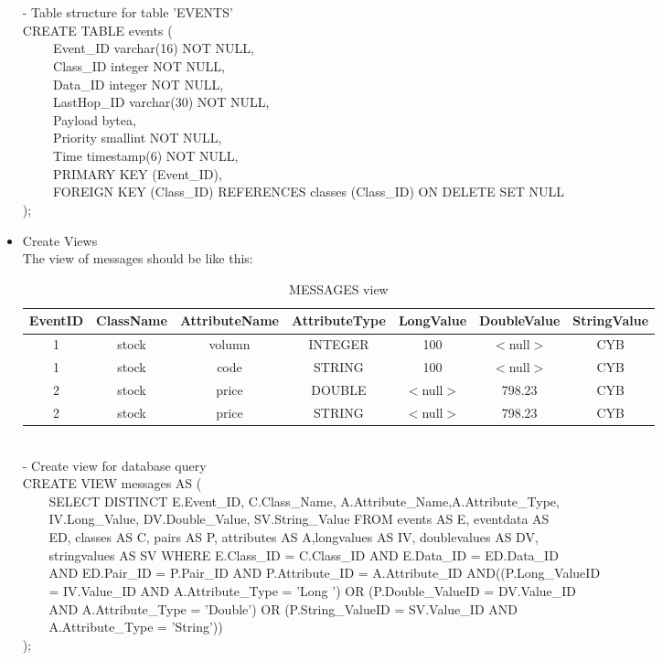 \documentclass[11pt]{article}
\begin{document}
\begin{itemize}
- Table structure for table 'EVENTS'\\
CREATE TABLE events (\\
\verb+    +  Event\_ID varchar(16) NOT NULL,\\
\verb+    +  Class\_ID integer NOT NULL,\\
\verb+    +  Data\_ID integer  NOT NULL,\\
\verb+    +  LastHop\_ID varchar(30) NOT NULL,\\
\verb+    +  Payload bytea,	\\
\verb+    +  Priority smallint NOT NULL,\\
\verb+    +  Time timestamp(6) NOT NULL,\\
\verb+    +  PRIMARY KEY (Event\_ID),\\
\verb+    +  FOREIGN KEY (Class\_ID) REFERENCES classes (Class\_ID) ON DELETE SET NULL\\
);\\
\item Create Views \\
The view of messages should be like this: \\
\begin{table}[!h]					%
\centering
\begin{tabular}{c|c|c|c|c|c|c}
\textbf{EventID} & ClassName & AttributeName & AttributeType & LongValue & DoubleValue & StringValue \\
\hline
1 & stock & volumn & INTEGER & 100 & $<$null$>$ & CYB \\
1 & stock & code & STRING & 100 & $<$null$>$ & CYB \\
2 & stock & price & DOUBLE & $<$null$>$ & 798.23 & CYB \\
2 & stock & price & STRING & $<$null$>$ & 798.23 & CYB
\end{tabular}
\caption{MESSAGES view}
\end{table}\\
- Create view for database query \\
CREATE VIEW messages AS ( \\
\verb+    +SELECT DISTINCT E.Event\_ID, C.Class\_Name, A.Attribute\_Name,A.Attribute\_Type, \\ \verb+    +IV.Long\_Value, DV.Double\_Value, SV.String\_Value FROM events AS E, eventdata AS \\
\verb+    +ED, classes AS C, pairs AS P, attributes AS A,longvalues AS IV, doublevalues AS DV, \\\verb+    +stringvalues AS SV WHERE E.Class\_ID = C.Class\_ID AND E.Data\_ID = ED.Data\_ID\\ 
\verb+    +AND ED.Pair\_ID = P.Pair\_ID AND P.Attribute\_ID = A.Attribute\_ID AND((P.Long\_ValueID \\
\verb+    += IV.Value\_ID AND A.Attribute\_Type = 'Long  ') OR (P.Double\_ValueID = DV.Value\_ID \\
\verb+    +AND A.Attribute\_Type = 'Double') OR (P.String\_ValueID = SV.Value\_ID AND \\ \verb+    +A.Attribute\_Type = 'String'))\\
); 
\end{itemize}
\end{document}
